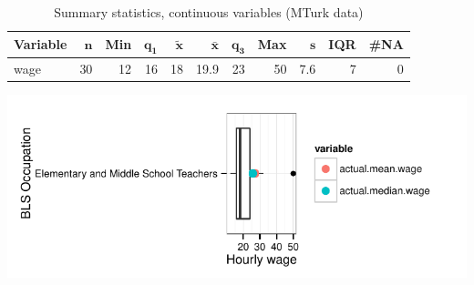 \documentclass[a4paper,10pt]{article}\usepackage[]{graphicx}\usepackage[]{color}
\makeatletter
\def\maxwidth{ %
  \ifdim\Gin@nat@width>\linewidth
    \linewidth
  \else
    \Gin@nat@width
  \fi
}
\makeatother
\begin{document}
\begin{table}[ht]
\centering
{\footnotesize
\begin{tabular}{lrrrrrrrrrr}
 \textbf{Variable} & $\mathbf{n}$ & \textbf{Min} & $\mathbf{q_1}$ & $\mathbf{\widetilde{x}}$ & $\mathbf{\bar{x}}$ & $\mathbf{q_3}$ & \textbf{Max} & $\mathbf{s}$ & \textbf{IQR} & \textbf{\#NA} \\ 
  \hline
wage & 30 & 12 & 16 & 18 & 19.9 & 23 & 50 & 7.6 & 7 & 0 \\ 
  \end{tabular}
}
\caption{Summary statistics, continuous variables (MTurk data)} 
\label{tab2:25-2020}
\end{table}


{\centering \includegraphics[width=\maxwidth]{figure/unnamed-chunk-214} 

}
\end{document}
